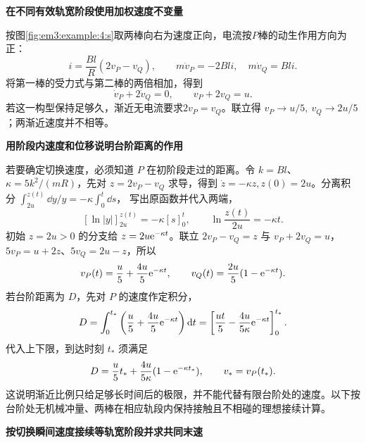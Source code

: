\begin{solution}\textbf{在不同有效轨宽阶段使用加权速度不变量}\par\nobreak
按图\ref{fig:em3:example:4:s}取两棒向右为速度正向，电流按$P$棒的动生作用方向为正：
\[
 i=\frac{Bl}{R}(2v_P-v_Q),\qquad
 m\dot v_P=-2Bli,\quad m\dot v_Q=Bli.
\]
将第一棒的受力式与第二棒的两倍相加，得到
\[
 \dot v_P+2\dot v_Q=0,\qquad v_P+2v_Q=u.
\]
若这一构型保持足够久，渐近无电流要求$2v_P=v_Q$。联立得
$v_P\to u/5,\ v_Q\to2u/5$；两渐近速度并不相等。



\par\medskip{}\noindent\textbf{用阶段内速度和位移说明台阶距离的作用}\par\nobreak
若要确定切换速度，必须知道 $P$ 在初阶段走过的距离。令 $k=Bl$、$\kappa=5k^2/(mR)$，先对 $z=2v_P-v_Q$ 求导，得到 $\dot z=-\kappa z,z(0)=2u$。分离积分
$\int_{2u}^{z(t)}\dd y/y=-\kappa\int_0^t\dd s$，
写出原函数并代入两端，
\[
 [\ln|y|]_{2u}^{z(t)}=-\kappa[s]_0^t,
 \qquad \ln\frac{z(t)}{2u}=-\kappa t.
\]
初始 $z=2u>0$ 的分支给 $z=2u\mathrm e^{-\kappa t}$。联立 $2v_P-v_Q=z$ 与 $v_P+2v_Q=u$，
$5v_P=u+2z$、$5v_Q=2u-z$，所以
\[
v_P(t)=\frac u5+\frac{4u}{5}\mathrm e^{-\kappa t},\qquad
v_Q(t)=\frac{2u}{5}(1-\mathrm e^{-\kappa t}).
\]
若台阶距离为 $D$，先对 $P$ 的速度作定积分，
\[
 D=\int_0^{t_*}\left(\frac u5+\frac{4u}{5}\mathrm e^{-\kappa t}\right)\mathop{}\!\mathrm d t
 =\left[\frac{ut}{5}-\frac{4u}{5\kappa}\mathrm e^{-\kappa t}\right]_0^{t_*}.
\]
代入上下限，到达时刻 $t_*$ 须满足
\[
D=\frac u5t_*+\frac{4u}{5\kappa}(1-\mathrm e^{-\kappa t_*}),\qquad
v_*=v_P(t_*).
\]
这说明渐近比例只给足够长时间后的极限，并不能代替有限台阶处的速度。以下按台阶处无机械冲量、两棒在相应轨段内保持接触且不相碰的理想接续计算。




\par\medskip{}\noindent\textbf{按切换瞬间速度接续等轨宽阶段并求共同末速}\par\nobreak
{}


\end{solution}
